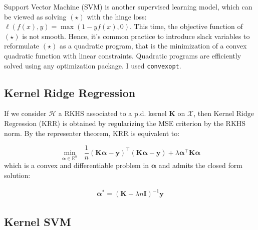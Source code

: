 \documentclass[final]{cvpr}
\begin{document}
	Support Vector Machine (SVM) is another supervised learning model, which can be viewed as solving $(\star)$ with the hinge loss:  $\ell  \left( f(x), y \right) = \max \left(1-yf(x), 0 \right)$. This time, the objective function of $(\star)$ is not smooth. Hence, it's common practice to introduce slack variables to reformulate $(\star)$ as a quadratic program, that is the minimization of a convex quadratic function with linear constraints. Quadratic programs are efficiently solved using any optimization package. I used \texttt{convexopt}.
	
	\subsection{Kernel Ridge Regression}
	
	If we consider $\mathcal{H}$ a RKHS associated to a p.d. kernel $\mathbf{K}$ on $\mathcal{X}$, then Kernel Ridge Regression (KRR) is obtained by regularizing the MSE criterion by the RKHS norm.	By the representer theorem, KRR is equivalent to:
	\vspace{-4mm}
		
	\begin{equation*}
		\underset{\boldsymbol{\alpha} \in \mathbb{R}^{n}}{\min } \textit{ } \frac{1}{n}(\mathbf{K} \boldsymbol{\alpha}-\mathbf{y})^{\top}(\mathbf{K} \boldsymbol{\alpha}-\mathbf{y})+\lambda \boldsymbol{\alpha}^{\top} \mathbf{K} \boldsymbol{\alpha}
	\end{equation*}
	\noindent
	which is a convex and differentiable problem in $\boldsymbol{\alpha}$ and admits the closed form solution:
	
	\begin{equation*}
		\begin{aligned}
			\boldsymbol{\alpha}^* = \left( \mathbf{K} + \lambda n \mathbf{I} \right)^{-1} \mathbf{y}
		\end{aligned}
	\end{equation*}
	
	\subsection{Kernel SVM} 
	
\end{document}
